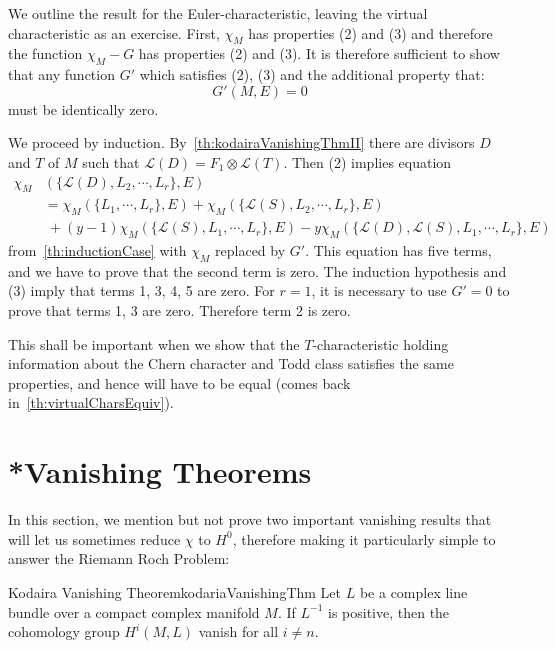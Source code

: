 \documentclass{ut-thesis}
\newenvironment{Proof}[1][]
  {\begin{ProofTcb}[#1]}
  {\end{ProofTcb}}
\newcommand{\CL}{{\mathcal{L}}}
\begin{document}
\begin{Proof}
  We outline the result for the Euler-characteristic, leaving the virtual characteristic as an exercise.
  First, $\chi_M$ has properties (2) and (3) and therefore the function $\chi_M-G$ has properties (2) and (3).
  It is therefore sufficient to show that any function $G'$ which satisfies (2), (3) and the additional property
  that:
  \[
    G'(M,E)=0
  \]
  must be identically zero.

  We proceed by induction. By~\cref{th:kodairaVanishingThmII} there are divisors $D$ and $T$ of $M$ such that $\CL(D)=F_1\otimes\CL(T)$.
  Then (2) implies equation
  \begin{align*}
    \chi_M&(\{ \CL(D),L_2,\cdots,L_r \},E)\\
    &= \chi_M(\{ L_1,\cdots,L_r \},E) + \chi_M(\{ \CL(S),L_2,\cdots,L_r \},E) \\
                        &\ + (y-1)\chi_M(\{\CL(S),L_1,\cdots,L_r\},E)
                        - y\chi_M(\{\CL(D),\CL(S),L_1,\cdots,L_r\},E)
  \end{align*}
  from~\cref{th:inductionCase} with $\chi_M$ replaced by $G'$. This equation has five terms, and we have to
  prove that the second term is zero. The induction hypothesis and (3) imply that terms 1, 3, 4, 5 are zero.
  For $r=1$, it is necessary to use $G'=0$ to prove that terms 1, 3 are zero. Therefore term 2 is zero.
\end{Proof}

This shall be important when we show that the $T$-characteristic holding information about the Chern character
and Todd class satisfies the same properties, and hence will have to be equal (comes back in~\cref{th:virtualCharsEquiv}).

\section{*Vanishing Theorems}\label{sec:Kodaira}

In this section, we mention but not prove two important vanishing results that will let us sometimes
reduce $\chi$ to $H^0$, therefore making it particularly simple to answer the Riemann Roch Problem:
\begin{thm}{Kodaira Vanishing Theorem}{kodariaVanishingThm}
  Let $L$ be a complex line bundle over a compact complex manifold $M$. If $L^{-1}$ is positive, then the
  cohomology group $H^i(M, L)$ vanish for all $i \ne n$.
\end{thm}
\end{document}
